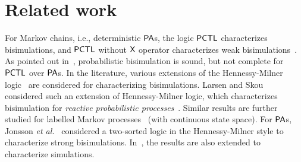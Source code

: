 \documentclass{LMCS}
\DeclareMathOperator{\X}{\text{\sf X}}
\newcommand{\PA}{{\sf PA}}
\newcommand{\PCTL}{{\sf PCTL}}
\begin{document}
\section{Related work}\label{sec:related}
For Markov chains, i.e., deterministic $\PA$s, the
logic $\PCTL$ characterizes bisimulations, and $\PCTL$ without $\X$ operator
characterizes weak bisimulations~\cite{HanssonJ90,BaierKHW05}.  As pointed out
in~\cite{SegalaL95}, probabilistic bisimulation  is sound, but not complete for $\PCTL$ over $\PA$s.
In the literature, various extensions of the Hennessy-Milner logic~\cite{HennessyM85} are considered for characterizing
bisimulations. Larsen and Skou~\cite{larsen1991bisimulation} considered such an
extension of Hennessy-Milner logic, which characterizes bisimulation for
\emph{reactive probabilistic processes}~\cite{larsen1991bisimulation}. Similar results are further studied for labelled Markov
processes~\cite{prakash-book,DesharnaisGJP10} (with continuous state space).  For $\PA$s, Jonsson
\emph{et al.}~\cite{Jonsson} considered a two-sorted logic in the
Hennessy-Milner style to characterize strong bisimulations. In~\cite{HermannsPSWZ11}, the results are 
also extended to characterize simulations.
\end{document}
